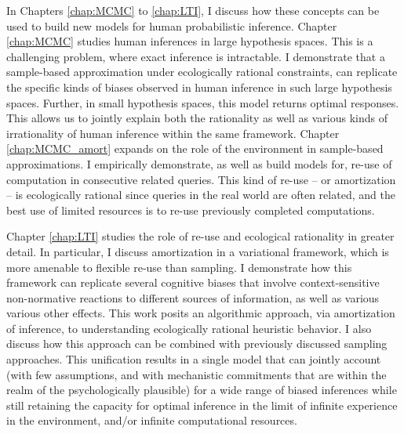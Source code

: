 In Chapters \ref{chap:MCMC} to \ref{chap:LTI}, I discuss how these concepts can be used to build new models for human probabilistic inference. Chapter \ref{chap:MCMC} studies human inferences in large hypothesis spaces. This is a challenging problem, where exact inference is intractable. I demonstrate that a sample-based approximation under ecologically rational constraints, can replicate the specific kinds of biases observed in human inference in such large hypothesis spaces. 
Further, in small hypothesis spaces, this model returns optimal responses. This allows us to jointly explain both the rationality as well as various kinds of irrationality of human inference within the same framework. Chapter \ref{chap:MCMC_amort} expands on the role of the environment in sample-based approximations. I empirically demonstrate, as well as build models for, re-use of computation in consecutive related queries. This kind of re-use -- or amortization -- is ecologically rational since queries in the real world are often related, and the best use of limited resources is to re-use previously completed computations.

Chapter \ref{chap:LTI} studies the role of re-use and ecological rationality in greater detail. In particular, I discuss amortization in a variational framework, which is more amenable to flexible re-use than sampling. I demonstrate how this framework can replicate several cognitive biases that involve context-sensitive non-normative reactions to different sources of information, 
as well as various various other effects.
This work posits an algorithmic approach, via amortization of inference, to understanding ecologically rational heuristic behavior. I also discuss how this approach can be combined with previously discussed sampling approaches. This unification results in a single model that can jointly account (with few assumptions, and with mechanistic commitments that are within the realm of the psychologically plausible) for a wide range of biased inferences while still retaining the capacity for optimal inference in the limit of infinite experience in the environment, and/or infinite computational resources.

